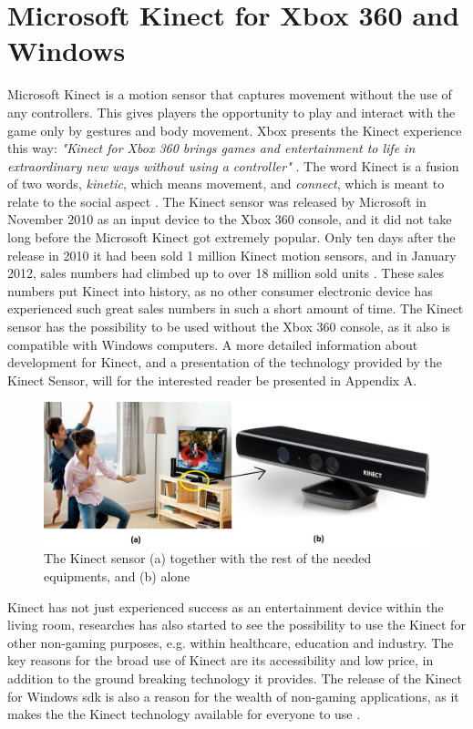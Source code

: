 \section{Microsoft Kinect for Xbox 360 and Windows}
Microsoft Kinect is a motion sensor that captures movement without the use of any controllers. This gives players the opportunity to play and interact with the game only by gestures and body movement. Xbox presents the Kinect experience this way: \emph{"Kinect for Xbox 360 brings games and entertainment to life in extraordinary new ways without using a controller"} \cite{kinectxboxdef}. The word Kinect is a fusion of two words, \emph{kinetic}, which means movement, and \emph{connect}, which is meant to relate to the social aspect \cite{howstuffworksKinect}. The Kinect sensor was released by Microsoft in November 2010 as an input device to the Xbox 360 console, and it did not take long before the Microsoft Kinect got extremely popular. Only ten days after the release in 2010 it had been sold 1 million Kinect motion sensors, and in January 2012, sales numbers had climbed up to over 18 million sold units \cite{kinectsales}. These sales numbers put Kinect into history, as no other consumer electronic device has experienced such great sales numbers in such a short amount of time. The Kinect sensor has the possibility to be used without the Xbox 360 console, as it also is compatible with Windows computers. A more detailed information about development for Kinect, and a presentation of the technology provided by the Kinect Sensor, will for the interested reader be presented in Appendix A.

\begin{figure} [H]
\centering
\includegraphics[scale=0.36]{sensorandtv}
\caption[The Kinect sensor]{The Kinect sensor (a) together with the rest of the needed equipments, and (b) alone}
\label{kinectsensor}
\end{figure} 
 
Kinect has not just experienced success as an entertainment device within the living room, researches has also started to see the possibility to use the Kinect for other non-gaming purposes, e.g. within healthcare, education and industry. The key reasons for the broad use of Kinect are its accessibility and low price, in addition to the ground breaking technology it provides. The release of the Kinect for Windows \ac{sdk} is also a reason for the wealth of non-gaming applications, as it makes the the Kinect technology available for everyone to use \cite{microsoftnews}. 

